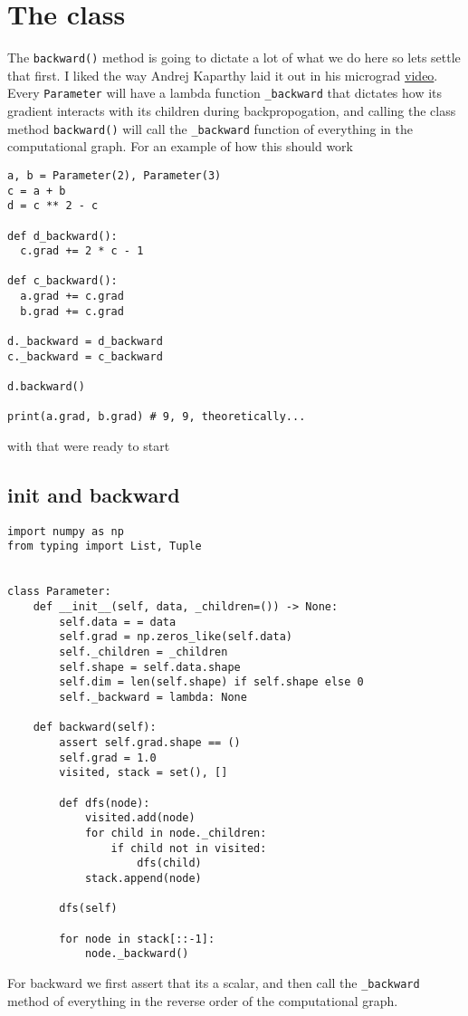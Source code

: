 \documentclass[11pt]{article}
\begin{document}
\section{The class}
The \texttt{backward()} method is going to dictate a lot of what we do here so lets settle that first. I liked the 
way Andrej Kaparthy laid it out in his micrograd \href{https://www.youtube.com/watch?v=VMj-3S1tku0}{video}. Every \texttt{Parameter} will have a lambda function 
\texttt{\_backward} that dictates how its gradient interacts with its children during backpropogation, and calling
the class method \texttt{backward()} will call the \texttt{\_backward} function of everything in the computational graph. 
For an example of how this should work
\begin{verbatim}
a, b = Parameter(2), Parameter(3)
c = a + b
d = c ** 2 - c

def d_backward():
  c.grad += 2 * c - 1

def c_backward():
  a.grad += c.grad
  b.grad += c.grad

d._backward = d_backward
c._backward = c_backward

d.backward()

print(a.grad, b.grad) # 9, 9, theoretically...
\end{verbatim}
with that were ready to start
\subsection{init and backward}
\begin{verbatim}
import numpy as np
from typing import List, Tuple


class Parameter:
    def __init__(self, data, _children=()) -> None:
        self.data = = data
        self.grad = np.zeros_like(self.data)
        self._children = _children
        self.shape = self.data.shape
        self.dim = len(self.shape) if self.shape else 0
        self._backward = lambda: None

    def backward(self):
        assert self.grad.shape == ()
        self.grad = 1.0
        visited, stack = set(), []

        def dfs(node):
            visited.add(node)
            for child in node._children:
                if child not in visited:
                    dfs(child)
            stack.append(node)

        dfs(self)

        for node in stack[::-1]:
            node._backward()
\end{verbatim}
For backward we first assert that its a scalar, and then call the \texttt{\_backward} method of everything in the 
reverse order of the computational graph. 
\end{document}
